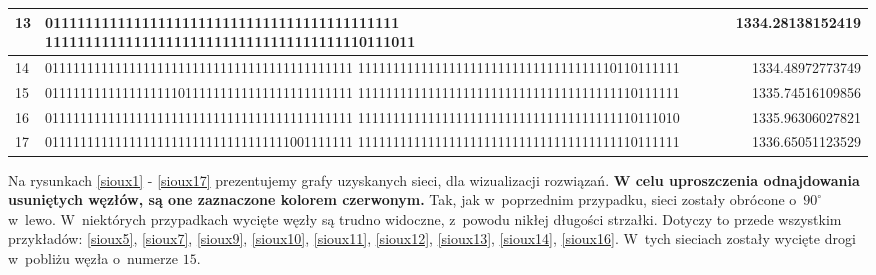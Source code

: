 \documentclass[twoside,12pt]{report}
\begin{document}
\begin{minipage}{\linewidth}
\begin{tabularx}{\linewidth}{ | l | X | r | }
	13 & 01111111111111111111111111111111111111111111 1111111111111111111111111111111111111110111011 & 1334.28138152419 \\ \hline
	14 & 01111111111111111111111111111111111111111111 1111111111111111111111111111111111110110111111 & 1334.48972773749 \\ \hline
	15 & 01111111111111111110111111111111111111111111 1111111111111111111111111111111111111110111111 & 1335.74516109856 \\ \hline
	16 & 01111111111111111111111111111111111111111111 1111111111111111111111111111111111111110111010 & 1335.96306027821 \\ \hline
	17 & 01111111111111111111111111111111111001111111 1111111111111111111111111111111111111110111111 & 1336.65051123529 \\ \hline
\end{tabularx}
\end{minipage}%

\newpage
Na rysunkach \ref{sioux1} - \ref{sioux17} prezentujemy grafy uzyskanych sieci, dla wizualizacji rozwiązań. \textbf{W celu uproszczenia odnajdowania usuniętych węzłów, są one zaznaczone kolorem czerwonym.} Tak, jak w~poprzednim przypadku, sieci zostały obrócone o~$90^{\circ}$ w~lewo. W~niektórych przypadkach wycięte węzły są trudno widoczne, z~powodu nikłej długości strzałki. Dotyczy to przede wszystkim przykładów: \ref{sioux5}, \ref{sioux7}, \ref{sioux9}, \ref{sioux10}, \ref{sioux11}, \ref{sioux12}, \ref{sioux13}, \ref{sioux14}, \ref{sioux16}. W~tych sieciach zostały wycięte drogi w~pobliżu węzła o~numerze $ 15$.
\end{document}

